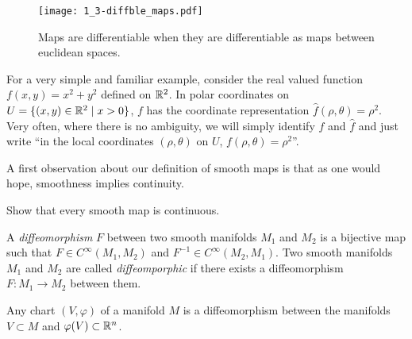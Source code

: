 \begin{figure}[htp]
  \centering
  \texttt{[image: 1\_3-diffble\_maps.pdf]}
  \caption{Maps are differentiable when they are differentiable as maps between euclidean spaces.}
  \label{fig:1.3-differentiable_maps}
\end{figure}

For a very simple and familiar example, consider the real valued function $f(x,y)= x^2+y^2$ defined on $\mathbb{R}^2$.
In polar coordinates on $U=\{(x,y)\in\mathbb{R}^2\mid x>0\}$, $f$ has the coordinate representation $\hat f (\rho, \theta) = \rho^2$.
Very often, where there is no ambiguity, we will simply identify $f$ and $\hat f$ and just write ``in the local coordinates $(\rho,\theta)$ on $U$, $f(\rho,\theta) = \rho^2$''.

A first observation about our definition of smooth maps is that as one would hope, smoothness implies continuity.

\begin{exercise}
  Show that every smooth map is continuous.
\end{exercise}

\begin{definition}
A \emph{diffeomorphism} $F$ between two smooth manifolds $M_1$ and $M_2$ is a bijective map such that $F\in C^\infty(M_1, M_2)$ and $F^{-1}\in C^\infty(M_2, M_1)$.
%
Two smooth manifolds $M_1$ and $M_2$ are called \emph{diffeomporphic} if there exists a diffeomorphism $F:M_1\to M_2$ between them.
\end{definition}

\begin{exercise}
Any chart $(V, \varphi)$ of a manifold $M$ is a diffeomorphism between the manifolds $V\subset M$ and $\varphi(V)\subset\mathbb{R}^n$.
\end{exercise}

